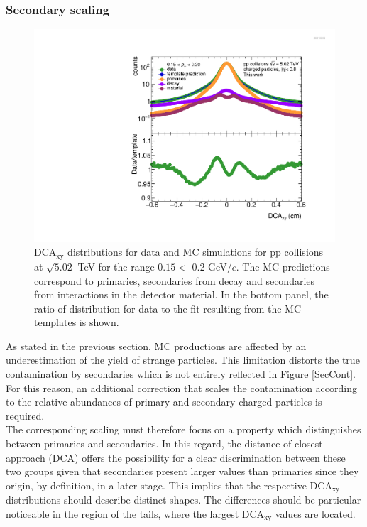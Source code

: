 \documentclass[12pt,a4paper]{report}
\begin{document}
\subsubsection{Secondary scaling}
\begin{figure}[tb!]
\centering
\includegraphics[width=12cm]{Plots/DCAdistributions.pdf}  
\caption{DCA$_\text{xy}$ distributions for data and MC simulations for pp collisions at $\sqrt{5.02}$ TeV for the \pt range $0.15 < $ \pt $0.2$ GeV/$c$. The MC predictions correspond to primaries, secondaries from decay and secondaries from interactions in the detector material. In the bottom panel, the ratio of distribution for data to the fit resulting from the MC templates is shown.}
\label{secScaling}
\end{figure}
As stated in the previous section, MC productions are affected by an underestimation of the yield of strange particles. This limitation distorts the true contamination by secondaries which is not entirely reflected in Figure \ref{SecCont}. For this reason, an additional correction that scales the contamination according to the relative abundances of primary and secondary charged particles is required.\\
The corresponding scaling must therefore focus on a property which distinguishes between primaries and secondaries. In this regard, the distance of closest approach (DCA) offers the possibility for a clear discrimination between these two groups given that secondaries present larger values than primaries since they origin, by definition, in a later stage. This implies that the respective DCA$_{\text{xy}}$ distributions should describe distinct shapes. The differences should be particular noticeable in the region of the tails, where the largest DCA$_{\text{xy}}$ values are located. \\
\end{document}
